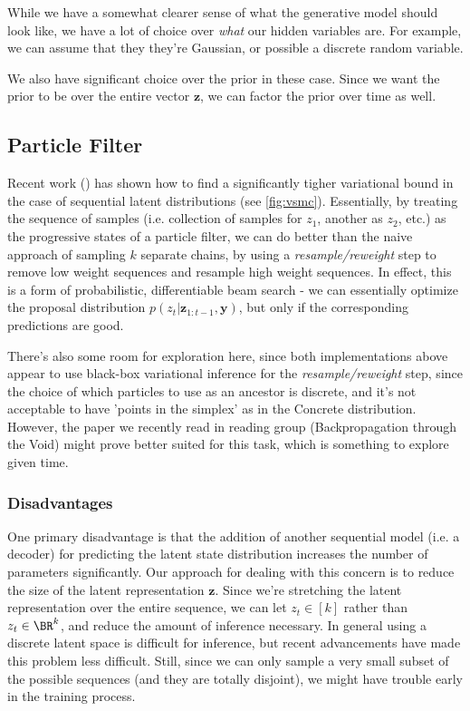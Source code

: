 \documentclass[12pt]{article}
\theoremstyle{definition}
\theoremstyle{remark}
\renewcommand{\v}[1]{\mathbf{#1}}
\begin{document}
While we have a somewhat clearer sense of what the generative model should look like, we have a lot of choice over \emph{what} our hidden variables are. For example, we can assume that they they're Gaussian, or possible a discrete random variable. 

\medskip

We also have significant choice over the prior in these case. Since we want the prior to be over the entire vector $\v z$, we can factor the prior over time as well. 

\subsection*{Particle Filter}

Recent work (\citet{naesseth2017variational, maddison2017filtering}) has shown how to find a significantly tigher variational bound in the case of sequential latent distributions (see \cref{fig:vsmc}). Essentially, by treating the sequence of samples (i.e. collection of samples for $z_1$, another as $z_2$, etc.) as the progressive states of a particle filter, we can do better than the naive approach of sampling $k$ separate chains, by using a \textit{resample/reweight} step to remove low weight sequences and resample high weight sequences. In effect, this is a form of probabilistic, differentiable beam search - we can essentially optimize the proposal distribution $p(z_t | \v z_{1:t-1}, \v y)$, but only if the corresponding predictions are good. 

\smallskip

There's also some room for exploration here, since both implementations above appear to use black-box variational inference for the \textit{resample/reweight} step, since the choice of which particles to use as an ancestor is discrete, and it's not acceptable to have 'points in the simplex' as in the Concrete distribution. However, the paper we recently read in reading group (Backpropagation through the Void) might prove better suited for this task, which is something to explore given time.

\subsubsection*{Disadvantages}
One primary disadvantage is that the addition of another sequential model (i.e. a decoder) for predicting the latent state distribution increases the number of parameters significantly. Our approach for dealing with this concern is to reduce the size of the latent representation $\v z$. Since we're stretching the latent representation over the entire sequence, we can let $z_t \in [k]$ rather than $z_t \in \BR^{k}$, and reduce the amount of inference necessary. In general using a discrete latent space is difficult for inference, but recent advancements have made this problem less difficult. Still, since we can only sample a very small subset of the possible sequences (and they are totally disjoint), we might have trouble early in the training process.  
\end{document}
